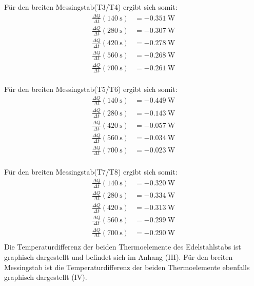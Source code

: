 Für den breiten Messingstab(T3/T4) ergibt sich somit:
\begin{align*} %
   \frac{\Delta Q}{\Delta t}(\SI{140}{\second}) &= \SI{-0.351}{\watt} \\ 
   \frac{\Delta Q}{\Delta t}(\SI{280}{\second}) &= \SI{-0.307}{\watt} \\ 
   \frac{\Delta Q}{\Delta t}(\SI{420}{\second}) &= \SI{-0.278}{\watt} \\ 
   \frac{\Delta Q}{\Delta t}(\SI{560}{\second}) &= \SI{-0.268}{\watt} \\ 
   \frac{\Delta Q}{\Delta t}(\SI{700}{\second}) &= \SI{-0.261}{\watt} \\ 
\end{align*}

Für den breiten Messingstab(T5/T6) ergibt sich somit:
\begin{align*} %
   \frac{\Delta Q}{\Delta t}(\SI{140}{\second}) &= \SI{-0.449}{\watt} \\ 
   \frac{\Delta Q}{\Delta t}(\SI{280}{\second}) &= \SI{-0.143}{\watt} \\ 
   \frac{\Delta Q}{\Delta t}(\SI{420}{\second}) &= \SI{-0.057}{\watt} \\ 
   \frac{\Delta Q}{\Delta t}(\SI{560}{\second}) &= \SI{-0.034}{\watt} \\ 
   \frac{\Delta Q}{\Delta t}(\SI{700}{\second}) &= \SI{-0.023}{\watt} \\ 
\end{align*}

Für den breiten Messingstab(T7/T8) ergibt sich somit:
\begin{align*} %
   \frac{\Delta Q}{\Delta t}(\SI{140}{\second}) &= \SI{-0.320}{\watt} \\ 
   \frac{\Delta Q}{\Delta t}(\SI{280}{\second}) &= \SI{-0.334}{\watt} \\ 
   \frac{\Delta Q}{\Delta t}(\SI{420}{\second}) &= \SI{-0.313}{\watt} \\ 
   \frac{\Delta Q}{\Delta t}(\SI{560}{\second}) &= \SI{-0.299}{\watt} \\ 
   \frac{\Delta Q}{\Delta t}(\SI{700}{\second}) &= \SI{-0.290}{\watt} \\ 
\end{align*}
\newline
Die Temperaturdifferenz der beiden Thermoelemente des Edelstahlstabs
ist graphisch dargestellt und befindet sich im Anhang (III).
Für den breiten Messingstab ist die Temperaturdifferenz der beiden
Thermoelemente ebenfalls graphisch dargestellt (IV).

